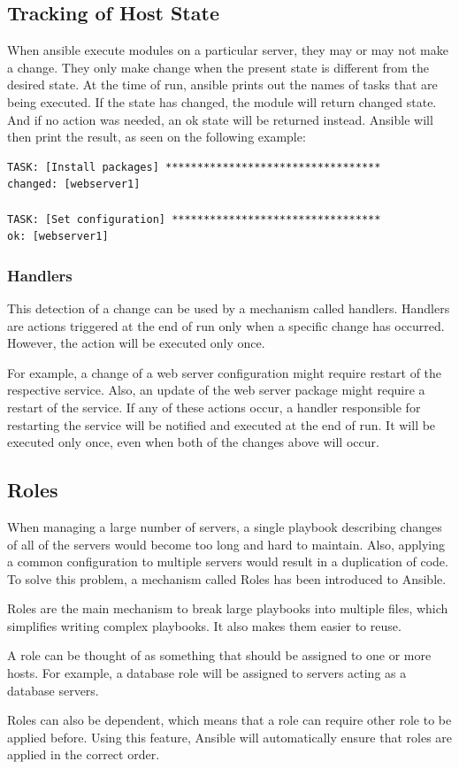 \subsection{Tracking of Host State}

When ansible execute modules on a particular server, they may or may not make a change. They only make change when the present state is different from the desired state. At the time of run, ansible prints out the names of tasks that are being executed. If the state has changed, the module will return changed state. And if no action was needed, an ok state will be returned instead. Ansible will then print the result, as seen on the following example:

\begin{lstlisting}
TASK: [Install packages] **********************************
changed: [webserver1]

TASK: [Set configuration] *********************************
ok: [webserver1]
\end{lstlisting}

\subsubsection*{Handlers}

This detection of a change can be used by a mechanism called handlers. \cite{UpAndRunning} Handlers are actions triggered at the end of run only when a specific change has occurred. However, the action will be executed only once.

For example, a change of a web server configuration might require restart of the respective service. Also, an update of the web server package might require a restart of the service. If any of these actions occur, a handler responsible for restarting the service will be notified and executed at the end of run. It will be executed only once, even when both of the changes above will occur.

\subsection{Roles}

When managing a large number of servers, a single playbook describing changes of all of the servers would become too long and hard to maintain. Also, applying a common configuration to multiple servers would result in a duplication of code. To solve this problem, a mechanism called Roles has been introduced to Ansible. \cite{AnsibleDoc}

Roles are the main mechanism to break large playbooks into multiple files, which simplifies writing complex playbooks. It also makes them easier to reuse.

A role can be thought of as something that should be assigned to one or more hosts. For example, a database role will be assigned to servers acting as a database servers.

Roles can also be dependent, which means that a role can require other role to be applied before. Using this feature, Ansible will automatically ensure that roles are applied in the correct order.

